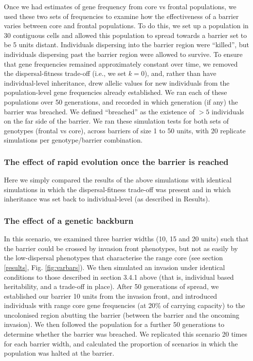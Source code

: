 \documentclass{article}
\begin{document}
Once we had estimates of gene frequency from core vs frontal
populations, we used these two sets of frequencies to examine how the
effectiveness of a barrier varies between core and frontal populations.
To do this, we set up a population in 30 contiguous cells and allowed this population to spread towards a barrier set to be 5 units distant. Individuals dispersing into the barrier region were ``killed'', but individuals dispersing past the barrier region were allowed to survive. To ensure that gene frequencies remained approximately constant over time, we removed the dispersal-fitness trade-off (i.e., we set \(k=0\)), and, rather than have individual-level inheritance, drew allelic values for new individuals from the population-level gene frequencies already established. We ran each of these populations over 50 generations, and recorded in which generation (if any) the barrier was breached. We defined ``breached'' as the existence of \(>5\) individuals on the far side of the barrier. We ran these simulation tests for both sets of genotypes (frontal vs core), across barriers of size 1 to 50 units, with 20 replicate simulations per genotype/barrier combination.

\subsubsection{The effect of rapid evolution once the barrier is reached}

Here we simply compared the results of the above simulations with identical simulations in which the dispersal-fitness trade-off was present and in which inheritance was set back to individual-level (as described in Results).

\subsubsection{The effect of a genetic
backburn}

In this scenario, we examined three barrier widths (10, 15 and 20 units) such that the
barrier could be crossed by invasion front phenotypes, but not as easily by
the low-dispersal phenotypes that characterise the range core (see section
\ref{results}, Fig. \ref{fig:varbars}). We then simulated an invasion under identical conditions to those described in section 3.4.1
above (that is, individual based heritability, and a trade-off in place). After 50 generations of spread, we established our barrier 10 units from
the invasion front, and introduced individuals with range core gene
frequencies (at 20\% of carrying capacity) to the uncolonised region
abutting the barrier (between the barrier and the oncoming invasion). We
then followed the population for a further 50 generations to determine
whether the barrier was breached. We replicated this scenario 20 times for each barrier width,
and calculated the proportion of scenarios in which the population was halted at the barrier.
\end{document}
